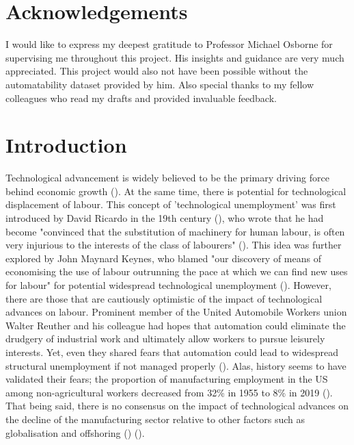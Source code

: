 \documentclass[11pt]{article}
\begin{document}
   

\section*{Acknowledgements}

	\thispagestyle{empty}
   I would like to express my deepest gratitude to Professor Michael Osborne for supervising me throughout this project. His insights and guidance are very much appreciated. This project would also not have been possible without the automatability dataset provided by him. Also special thanks to my fellow colleagues who read my drafts and provided invaluable feedback.


\clearpage


\section{Introduction}
\label{sec:Introduction}

Technological advancement is widely believed to be the primary driving force behind economic growth (\cite{RePEc:ssa:lembks:dosietal-1988}). At the same time, there is potential for technological displacement of labour. This concept of 'technological unemployment' was first introduced by David Ricardo in the 19th century (\cite{WoirolGregoryR1997Ttua}), who wrote that he had become "convinced that the substitution of machinery for human labour, is often very injurious to the interests of the class of labourers" (\cite{10.1257/jep.33.2.229}). This idea was further explored by John Maynard Keynes, who blamed "our discovery of means of economising the use of labour outrunning the pace at which we can find new uses for labour" for potential widespread technological unemployment (\cite{Keynes2010}). However, there are those that are cautiously optimistic of the impact of technological advances on labour. Prominent member of the United Automobile Workers union Walter Reuther and his colleague had hopes that automation could eliminate the drudgery of industrial work and ultimately allow workers to pursue leisurely interests. Yet, even they shared fears that automation could lead to widespread structural unemployment if not managed properly (\cite{SteigerwaldDavid2010WRtU}). Alas, history seems to have validated their fears; the proportion of manufacturing employment in the US among non-agricultural workers decreased from 32\% in 1955 to 8\% in 2019 (\cite{rose_2021}). That being said, there is no consensus on the impact of technological advances on the decline of the manufacturing sector relative to other factors such as globalisation and offshoring (\cite{RoseElizabethL.2021TDoU}) (\cite{krugman2019globalization}).
\end{document}
